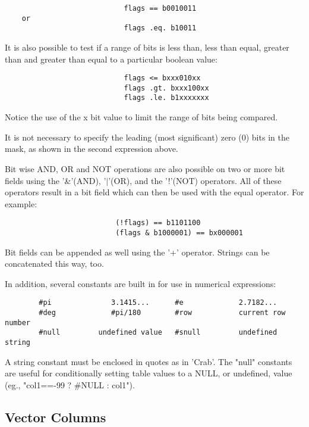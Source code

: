 \documentclass[11pt]{book}
\begin{document}
\begin{verbatim}
                            flags == b0010011
    or
                            flags .eq. b10011
\end{verbatim}

    It is also possible to test if a range of bits is  less  than,  less
    than  equal,  greater  than  and  greater than equal to a particular
    boolean value:


\begin{verbatim}
                            flags <= bxxx010xx
                            flags .gt. bxxx100xx
                            flags .le. b1xxxxxxx
\end{verbatim}

    Notice the use of the x bit value to limit the range of  bits  being
    compared.

    It  is  not necessary to specify the leading (most significant) zero
    (0) bits in the mask, as shown in the second expression above.

    Bit wise AND, OR and NOT operations are  also  possible  on  two  or
    more  bit  fields  using  the  '\&'(AND),  '$|$'(OR),  and the '!'(NOT)
    operators. All of these operators result in a bit  field  which  can
    then be used with the equal operator. For example:


\begin{verbatim}
                          (!flags) == b1101100
                          (flags & b1000001) == bx000001
\end{verbatim}

    Bit  fields can be appended as well using the '+' operator.  Strings
    can be concatenated this way, too.

    In addition, several constants are built in  for  use  in  numerical
    expressions:


\begin{verbatim}
        #pi              3.1415...      #e             2.7182...
        #deg             #pi/180        #row           current row number
        #null         undefined value   #snull         undefined string
\end{verbatim}

    A  string constant must  be enclosed  in quotes  as in  'Crab'.  The
    "null" constants  are useful for conditionally  setting table values
    to a NULL, or undefined, value (eg., "col1==-99 ? \#NULL : col1").


\subsection{Vector Columns}
\end{document}
